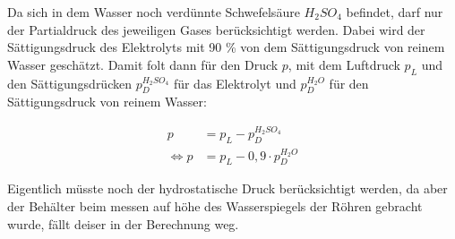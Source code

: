 Da sich in dem Wasser noch verdünnte Schwefelsäure $H_2SO_4$ befindet, darf nur der
Partialdruck des jeweiligen Gases berücksichtigt werden. Dabei wird der Sättigungsdruck des Elektrolyts
mit 90 \% von dem Sättigungsdruck von reinem Wasser geschätzt.
Damit folt dann für den Druck $p$, mit dem Luftdruck $p_L$ und den Sättigungsdrücken
$p_D^{H_2SO_4}$ für das Elektrolyt und $p_D^{H_2O}$ für den Sättigungsdruck von reinem Wasser:

\begin{align}
    p &= p_L - p_D^{H_2SO_4}\\
    \Leftrightarrow p &= p_L - 0,9 \cdot p_D^{H_2O}
    \label{eq:p}
\end{align}

Eigentlich müsste noch der hydrostatische Druck berücksichtigt werden, da aber der Behälter beim messen auf höhe des Wasserspiegels der Röhren gebracht wurde, fällt deiser in der Berechnung weg.